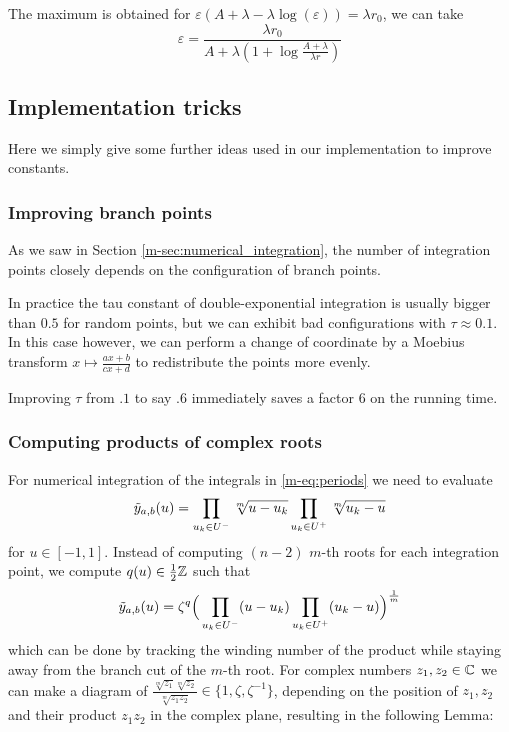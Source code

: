 \documentclass[main.tex]{subfiles}
\begin{document}
   The maximum is obtained for $ε(A+λ-λ\log(ε))=λr_0$,
   we can take
   \[ ε = \frac{λr_0}{A+λ(1+\log\frac{A+λ}{λr})} \]
   
   \subsection{Implementation tricks}

   Here we simply give some further ideas used in our implementation to improve constants.

   \subsubsection{Improving branch points}

   As we saw in Section \ref{m-sec:numerical_integration}, the number of integration points
   closely depends on the configuration of branch points.

   In practice the tau constant of double-exponential integration is usually bigger than $0.5$
   for random points, but we can exhibit bad configurations with $τ\approx 0.1$. In this case
   however, we can perform a change of coordinate by a Moebius transform
   $x\mapsto \frac{ax+b}{cx+d}$ to redistribute the points more evenly.

   Improving $τ$ from $.1$ to say $.6$ immediately saves a factor $6$ on the running time.

  \subsubsection{Computing products of complex roots}\label{subsec:computing_roots}

  For numerical integration of the integrals in \eqref{m-eq:periods}
  we need to evaluate
  \begin{equation*}
   \tilde{y}_{a,b}(u) = \prod_{u_k\in U^-} \sqrt[m]{u-u_k}\prod_{u_k\in U^+}\sqrt[m]{u_k-u}
  \end{equation*}
  for $u \in [-1,1]$. Instead of computing $(n-2)$ $m$-th roots for each
  integration point, we compute $q(u)\in\frac12\mathbb{Z}$ such that
  \begin{equation*}
   \tilde{y}_{a,b}(u) = \zeta^q \Big( \prod_{u_k\in U^-}(u-u_k) \prod_{u_k\in U^+} (u_k-u) \Big)^{\frac{1}{m}}
  \end{equation*}
 which can be done by tracking
  the winding number of the product while staying away from the branch cut
  of the $m$-th root.
  For complex numbers $z_1,z_2 \in \mathbb{C}$ we can make a diagram of
  $\frac{\sqrt[m]{z_1}\sqrt[m]{z_2}}{\sqrt[m]{z_1z_2}} \in \{ 1, \zeta,
  \zeta^{-1} \}$, depending on the position of $z_1,z_2$ and their product
  $z_1z_2$ in the complex plane, resulting in the following Lemma:
\end{document}
